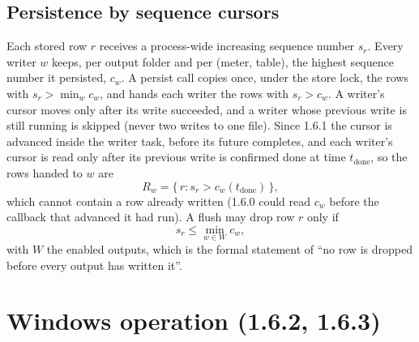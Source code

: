 \documentclass[11pt,a4paper]{article}
\begin{document}
\subsection{Persistence by sequence cursors}\label{sec:cursors}
Each stored row $r$ receives a process-wide increasing sequence number $s_r$.
Every writer $w$ keeps, per output folder and per (meter, table), the highest
sequence number it persisted, $c_w$. A persist call copies once, under the
store lock, the rows with $s_r > \min_w c_w$, and hands each writer the rows
with $s_r > c_w$. A writer's cursor moves only after its write succeeded, and a
writer whose previous write is still running is skipped (never two writes to
one file). Since 1.6.1 the cursor is advanced inside the writer task, before
its future completes, and each writer's cursor is read only after its previous
write is confirmed done at time $t_{\text{done}}$, so the rows handed to $w$ are
\begin{equation}
  R_w = \{\, r : s_r > c_w(t_{\text{done}}) \,\},
\end{equation}
which cannot contain a row already written (1.6.0 could read $c_w$ before the
callback that advanced it had run). A flush may drop row $r$ only if
\begin{equation}
  s_r \le \min_{w \in W} c_w ,
\end{equation}
with $W$ the enabled outputs, which is the formal statement of
``no row is dropped before every output has written it''.

\section{Windows operation (1.6.2, 1.6.3)}\label{sec:windows}
\end{document}
